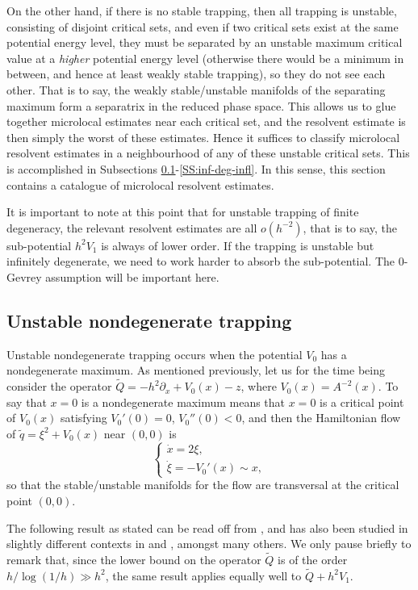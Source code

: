 \documentclass[twoside, final]{amsart}
\theoremstyle{definition}
\numberwithin{equation}{section}
\begin{document}
On the other hand, if there is no stable trapping, then all trapping
is unstable, consisting of 
disjoint critical sets, and even if two critical sets exist at the
same potential energy level, they must be separated by an unstable
maximum 
critical value at a {\it higher} potential energy level (otherwise
there would be a minimum in between, and hence at least weakly stable trapping), so they do
not see each other.  That is to say, the weakly stable/unstable
manifolds of the separating maximum form a separatrix in the reduced
phase space.  This allows us to glue together microlocal
estimates near each critical set, and the resolvent estimate is then
simply the worst of these estimates.  Hence it suffices to classify
microlocal resolvent estimates in a neighbourhood of any of these
unstable critical sets.  This is accomplished in Subsections
\ref{SS:unst-nd}-\ref{SS:inf-deg-infl}.  In this sense, this section
contains a catalogue of microlocal resolvent estimates.

It is important to note at this point that for unstable trapping of
finite degeneracy, the relevant resolvent estimates are all
$o(h^{-2})$, that is to say, the sub-potential $h^2 V_1$ is always of
lower order.  If the trapping is unstable but infinitely degenerate,
we need to work harder to absorb the sub-potential.  The 0-Gevrey
assumption will be important here.

\subsection{Unstable nondegenerate trapping}

\label{SS:unst-nd}

Unstable nondegenerate trapping occurs when the potential $V_0$ has a
nondegenerate maximum.  As mentioned previously, let us for the time
being consider the operator ${\widetilde{Q}} = -h^2 {\partial}_x + V_0(x)-z$, where $V_0(x) =
A^{-2}(x)$.  To say that $x = 0$ is a nondegenerate maximum means that
 $x = 0$ is a critical point of
$V_0(x)$ satisfying $V_0'(0) = 0$, $V_0''(0) < 0$, and then the Hamiltonian flow
of ${\tilde{q}} = \xi^2 + V_0(x)$ near $(0,0)$ is
\[
\begin{cases}
\dot{x} = 2 \xi, \\ 
\dot{\xi} = -V_0'(x) \sim x,
\end{cases}
\]
so that the stable/unstable manifolds for the flow are transversal at
the critical point $(0,0)$.

The following result as stated can be read off from \cite{Chr-NC,Chr-NC-erratum,Chr-QMNC}, and has also been
studied in slightly different contexts in \cite{CdVP-I,CdVP-II} and
\cite{BuZw-bb}, amongst many others.  We only pause briefly to remark
that, since the lower bound on the operator ${\widetilde{Q}}$ is of the order
$h/\log(1/h) \gg h^2$, the same result applies equally well to ${\widetilde{Q}} +
h^2 V_1$.  
\end{document}
